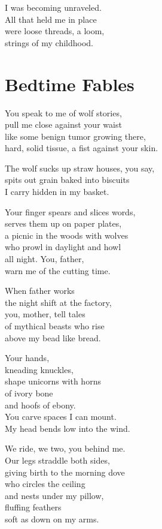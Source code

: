 \documentclass[twoside,10pt]{book}
\begin{document}
I was becoming unraveled.\\
All that held me in place\\
were loose threads, a loom,\\
strings of my childhood.

\clearpage
\section{Bedtime Fables}

You speak to me of wolf stories,\\
pull me close against your waist\\
like some benign tumor growing there,\\
hard, solid tissue, a fist against your skin.

The wolf sucks up straw houses, you say,\\
spits out grain baked into biscuits\\
I carry hidden in my basket.

Your finger spears and slices words,\\
serves them up on paper plates,\\
a picnic in the woods with wolves\\
who prowl in daylight and howl\\
all night. You, father,\\
warn me of the cutting time.

When father works\\
the night shift at the factory,\\
you, mother, tell tales\\
of mythical beasts who rise\\
above my bead like bread.

Your hands,\\
kneading knuckles,\\
shape unicorns with horns\\
of ivory bone\\
and hoofs of ebony.\\
You carve spaces I can mount.\\
My head bends low into the wind.

We ride, we two, you behind me.\\
Our legs straddle both sides,\\
giving birth to the morning dove\\
who circles the ceiling\\
and nests under my pillow,\\
fluffing feathers\\
soft as down on my arms.
\end{document}

